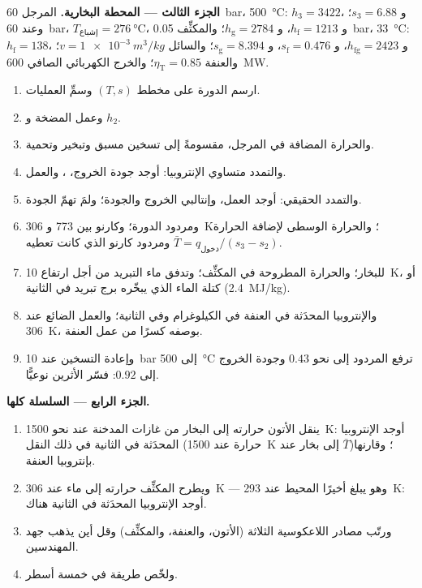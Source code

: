 \begin{problem}
\textbf{الجزء الثالث --- المحطة البخارية.}
المرجل \qty{60}{bar}، \qty{500}{\celsius}: $h_3 = 3422$، و $s_3 = 6.88$؛ وعند
\qty{60}{bar}، $T_{\text{إشباع}} = \qty{276}{\celsius}$، و $h_{\text{f}} = 1213$،
و $h_{\text{g}} = 2784$؛ والمكثِّف \qty{0.05}{bar}، \qty{33}{\celsius}:
$h_{\text{f}} = 138$، و $h_{\text{fg}} = 2423$، و $s_{\text{f}} = 0.476$، و $s_{\text{g}} =
8.394$؛ والسائل $v = \qty{1e-3}{m^3/kg}$؛ والعنفة $\eta_{\text{T}} = 0.85$؛
والخرج الكهربائي الصافي \qty{600}{MW}.
\begin{enumerate}[resume]
  \item ارسم الدورة على مخطط $(T,s)$ وسمِّ العمليات.
  \item وعمل المضخة و $h_2$.
  \item والحرارة المضافة في المرجل، مقسومةً إلى تسخين مسبق وتبخير
        وتحمية.
  \item والتمدد متساوي الإنتروبيا: أوجد جودة الخروج، ، والعمل.
  \item والتمدد الحقيقي: أوجد العمل، وإنتالبي الخروج والجودة؛ ولمَ تهمّ
        الجودة.
  \item ومردود الدورة؛ وكارنو بين \qty{773}{} و \qty{306}{K}؛
        والحرارة الوسطى لإضافة الحرارة $\bar T = q_{\text{دخول}}/(s_3
        - s_2)$ ومردود كارنو الذي كانت تعطيه.
  \item {} للبخار؛ والحرارة المطروحة في المكثِّف؛ وتدفق ماء
        التبريد من أجل ارتفاع \qty{10}{K}، أو كتلة الماء الذي يبخّره برج
        تبريد في الثانية (\qty{2.4}{MJ/kg}).
  \item والإنتروبيا المحدَثة في العنفة في الكيلوغرام وفي الثانية؛
        والعمل الضائع عند \qty{306}{K}، بوصفه كسرًا من عمل
        العنفة.
  \item وإعادة التسخين عند \qty{10}{bar} إلى \qty{500}{\celsius} ترفع
        المردود إلى نحو $0.43$ وجودة الخروج إلى $0.92$:
        فسّر الأثرين نوعيًّا.
\end{enumerate}

\textbf{الجزء الرابع --- السلسلة كلها.}
\begin{enumerate}[resume]
  \item ينقل الأتون حرارته إلى البخار من غازات المدخنة عند
        نحو \qty{1500}{K}: أوجد الإنتروبيا المحدَثة في الثانية في ذلك النقل
        (حرارة عند \qty{1500}{K} إلى بخار عند $\bar T$)؛ وقارنها
        بإنتروبيا العنفة.
  \item ويطرح المكثِّف حرارته إلى ماء عند \qty{306}{K} ---
        وهو يبلغ أخيرًا المحيط عند \qty{293}{K}: أوجد الإنتروبيا
        المحدَثة في الثانية هناك.
  \item ورتّب مصادر اللاعكوسية الثلاثة (الأتون، والعنفة،
        والمكثِّف) وقل أين يذهب جهد المهندسين.
  \item ولخّص طريقة  في خمسة أسطر.
\end{enumerate}
\end{problem}
